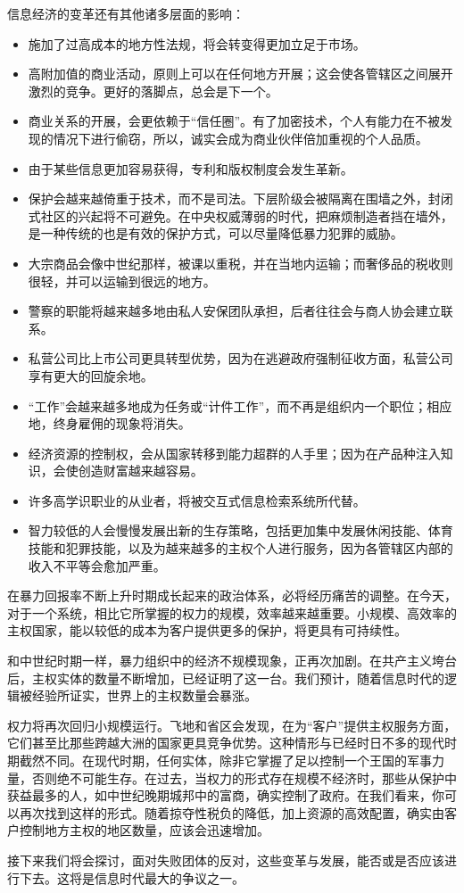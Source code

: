 信息经济的变革还有其他诸多层面的影响：

\begin{itemize}
    \item 施加了过高成本的地方性法规，将会转变得更加立足于市场。
    \item 高附加值的商业活动，原则上可以在任何地方开展；这会使各管辖区之间展开激烈的竞争。更好的落脚点，总会是下一个。
    \item 商业关系的开展，会更依赖于“信任圈”。有了加密技术，个人有能力在不被发现的情况下进行偷窃，所以，诚实会成为商业伙伴倍加重视的个人品质。
    \item 由于某些信息更加容易获得，专利和版权制度会发生革新。
    \item 保护会越来越倚重于技术，而不是司法。下层阶级会被隔离在围墙之外，封闭式社区的兴起将不可避免。在中央权威薄弱的时代，把麻烦制造者挡在墙外，是一种传统的也是有效的保护方式，可以尽量降低暴力犯罪的威胁。
    \item 大宗商品会像中世纪那样，被课以重税，并在当地内运输；而奢侈品的税收则很轻，并可以运输到很远的地方。
    \item 警察的职能将越来越多地由私人安保团队承担，后者往往会与商人协会建立联系。
    \item 私营公司比上市公司更具转型优势，因为在逃避政府强制征收方面，私营公司享有更大的回旋余地。
    \item “工作”会越来越多地成为任务或“计件工作”，而不再是组织内一个职位；相应地，终身雇佣的现象将消失。
    \item 经济资源的控制权，会从国家转移到能力超群的人手里；因为在产品种注入知识，会使创造财富越来越容易。
    \item 许多高学识职业的从业者，将被交互式信息检索系统所代替。
    \item 智力较低的人会慢慢发展出新的生存策略，包括更加集中发展休闲技能、体育技能和犯罪技能，以及为越来越多的主权个人进行服务，因为各管辖区内部的收入不平等会愈加严重。
\end{itemize}

在暴力回报率不断上升时期成长起来的政治体系，必将经历痛苦的调整。在今天，对于一个系统，相比它所掌握的权力的规模，效率越来越重要。小规模、高效率的主权国家，能以较低的成本为客户提供更多的保护，将更具有可持续性。

和中世纪时期一样，暴力组织中的经济不规模现象，正再次加剧。在共产主义垮台后，主权实体的数量不断增加，已经证明了这一台。我们预计，随着信息时代的逻辑被经验所证实，世界上的主权数量会暴涨。

权力将再次回归小规模运行。飞地和省区会发现，在为“客户”提供主权服务方面，它们甚至比那些跨越大洲的国家更具竞争优势。这种情形与已经时日不多的现代时期截然不同。在现代时期，任何实体，除非它掌握了足以控制一个王国的军事力量，否则绝不可能生存。在过去，当权力的形式存在规模不经济时，那些从保护中获益最多的人，如中世纪晚期城邦中的富商，确实控制了政府。在我们看来，你可以再次找到这样的形式。随着掠夺性税负的降低，加上资源的高效配置，确实由客户控制地方主权的地区数量，应该会迅速增加。

接下来我们将会探讨，面对失败团体的反对，这些变革与发展，能否或是否应该进行下去。这将是信息时代最大的争议之一。